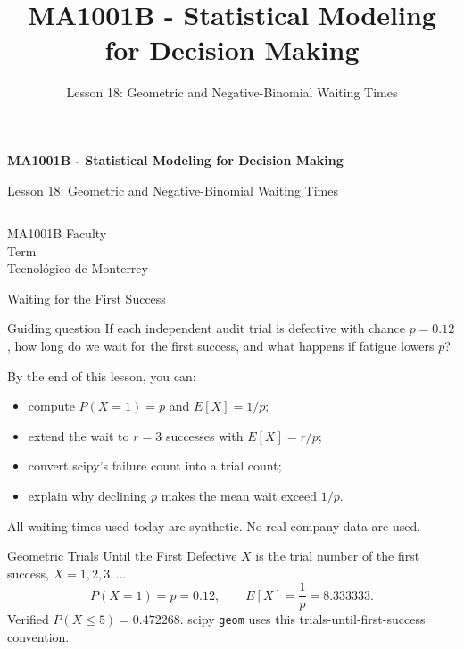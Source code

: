 \documentclass[aspectratio=169,10pt,english]{beamer}
\title{MA1001B - Statistical Modeling for Decision Making}
\subtitle{Lesson 18: Geometric and Negative-Binomial Waiting Times}
\author{}
\institute{Tecnol\'ogico de Monterrey}
\date{}
\begin{document}
\begin{frame}[plain]
  \vspace{1.2cm}
  {\Large\bfseries MA1001B - Statistical Modeling for Decision Making\par}
  \vspace{0.7cm}
  {\large Lesson 18: Geometric and Negative-Binomial Waiting Times\par}
  \vspace{0.7cm}
  {\color{TecRojo}\rule{\textwidth}{1.2pt}}
  \vspace{0.8cm}

  MA1001B Faculty\\[0.3cm]
  Term\\[0.3cm]
  Tecnol\'ogico de Monterrey
\end{frame}

\begin{frame}{Waiting for the First Success}
  \begin{alertblock}{Guiding question}
    If each independent audit trial is defective with chance $p=0.12$, how
    long do we wait for the first success, and what happens if fatigue lowers
    $p$?
  \end{alertblock}

  \vspace{0.6em}
  By the end of this lesson, you can:
  \begin{itemize}
    \item compute $P(X=1)=p$ and $E[X]=1/p$;
    \item extend the wait to $r=3$ successes with $E[X]=r/p$;
    \item convert scipy's failure count into a trial count;
    \item explain why declining $p$ makes the mean wait exceed $1/p$.
  \end{itemize}

  \vfill
  \scriptsize All waiting times used today are synthetic. No real company data are used.
\end{frame}

\begin{frame}{Geometric Trials Until the First Defective}
  \small
  $X$ is the trial number of the first success, $X=1,2,3,\ldots$
  \[
    P(X=1)=p=0.12,\qquad E[X]=\frac{1}{p}=8.333333.
  \]
  Verified $P(X\le 5)=0.472268$. scipy \texttt{geom} uses this trials-until-first-success convention.
\end{frame}
\end{document}
